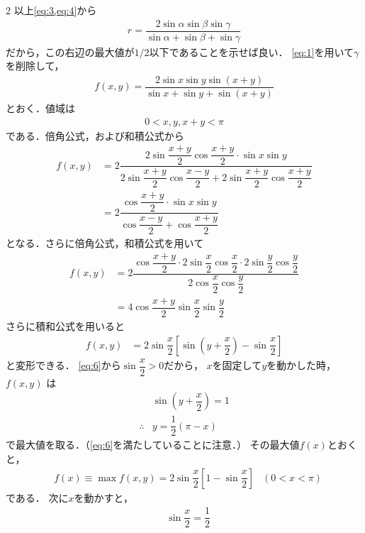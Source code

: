\documentclass[../../main.tex]{subfiles}
\begin{document}
\begin{multicols}{2}
  以上\cref{eq:3,eq:4}から
  \begin{align}
    r = \dfrac{2 \sin\alpha\sin\beta\sin\gamma}{\sin \alpha + \sin \beta + \sin \gamma} \label{eq:5}
  \end{align}
  だから，この右辺の最大値が$1/2$以下であることを示せば良い．
  \cref{eq:1}を用いて$\gamma$を削除して，
  \begin{align}
    f(x, y) = \dfrac{2\sin x \sin y \sin(x+y)}{\sin x + \sin y + \sin(x+y)}
  \end{align}
  とおく．値域は
  \begin{align}
    0 < x, y, x+y < \pi \label{eq:6}
  \end{align}
  である．倍角公式，および和積公式から
  \begin{align}
    f(x, y)
    & = 2\dfrac{2 \sin \dfrac{x+y}{2} \cos \dfrac{x+y}{2} \cdot \sin x \sin y}{2 \sin \dfrac{x+y}{2} \cos \dfrac{x-y}{2} + 2 \sin \dfrac{x+y}{2} \cos \dfrac{x+y}{2}} \\
    & = 2\dfrac{\cos \dfrac{x+y}{2} \cdot \sin x \sin y}{\cos \dfrac{x-y}{2} + \cos \dfrac{x+y}{2}}
  \end{align}
  となる．さらに倍角公式，和積公式を用いて
  \begin{align}
    f(x,y)
    & = 2\dfrac{\cos \dfrac{x+y}{2} \cdot 2\sin \dfrac{x}{2}\cos\dfrac{x}{2} \cdot 2\sin \dfrac{y}{2}\cos\dfrac{y}{2}}{2 \cos \dfrac{x}{2} \cos \dfrac{y}{2}} \\
    & = 4\cos \dfrac{x+y}{2} \sin \dfrac{x}{2} \sin \dfrac{y}{2}
  \end{align}
  さらに積和公式を用いると
  \begin{align}
    f(x,y)
    & = 2 \sin \dfrac{x}{2} \left[\sin\left(y+\dfrac{x}{2}\right)-\sin\dfrac{x}{2}\right]
  \end{align}
  と変形できる．
  \cref{eq:6}から$\sin \dfrac{x}{2} > 0$だから，
  $x$を固定して$y$を動かした時，
  $f(x, y)$ は
  \begin{align}
    & \sin\left(y+\dfrac{x}{2}\right) = 1   \\
    \therefore
    & y = \dfrac{1}{2}\left(\pi - x \right)
  \end{align}
  で最大値を取る．（\cref{eq:6}を満たしていることに注意．）
  その最大値$f(x)$とおくと，
  \begin{align}
    & f(x) \equiv \max f(x, y) = 2\sin \dfrac{x}{2} \left[1-\sin\dfrac{x}{2}\right] & (0 < x < \pi)
  \end{align}
  である．
  次に$x$を動かすと，
  \begin{align}
    & \sin \dfrac{x}{2} = \dfrac{1}{2} \\

\end{align}
\end{multicols}
\end{document}
